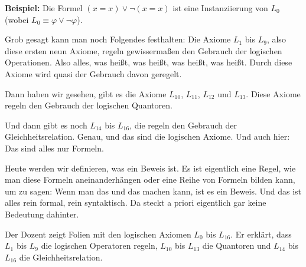 \begin{math-stroke}

\textbf{Beispiel:}
Die Formel $(x=x) \lor \neg(x=x)$ ist eine Instanziierung von $L_0$ (wobei $L_0 \equiv \varphi \lor \neg\varphi$).
\end{math-stroke}

\begin{spoken-clean}[00:04:41 - 00:06:26]
Grob gesagt kann man noch Folgendes festhalten: Die Axiome $L_1$ bis $L_9$, also diese ersten neun Axiome, regeln gewissermaßen den Gebrauch der logischen Operationen. Also alles, was  heißt, was  heißt, was  heißt, was  heißt. Durch diese Axiome wird quasi der Gebrauch davon geregelt.

Dann haben wir gesehen, gibt es die Axiome $L_{10}$, $L_{11}$, $L_{12}$ und $L_{13}$. Diese Axiome regeln den Gebrauch der logischen Quantoren.

Und dann gibt es noch $L_{14}$ bis $L_{16}$, die regeln den Gebrauch der Gleichheitsrelation. Genau, und das sind die logischen Axiome. Und auch hier: Das sind alles nur Formeln.

Heute werden wir definieren, was ein Beweis ist. Es ist eigentlich eine Regel, wie man diese Formeln aneinanderhängen oder eine Reihe von Formeln bilden kann, um zu sagen: Wenn man das und das machen kann, ist es ein Beweis. Und das ist alles rein formal, rein syntaktisch. Da steckt a priori eigentlich gar keine Bedeutung dahinter.
\end{spoken-clean}

\begin{meta-note}
Der Dozent zeigt Folien mit den logischen Axiomen $L_0$ bis $L_{16}$. Er erklärt, dass $L_1$ bis $L_9$ die logischen Operatoren regeln, $L_{10}$ bis $L_{13}$ die Quantoren und $L_{14}$ bis $L_{16}$ die Gleichheitsrelation.
\end{meta-note}

